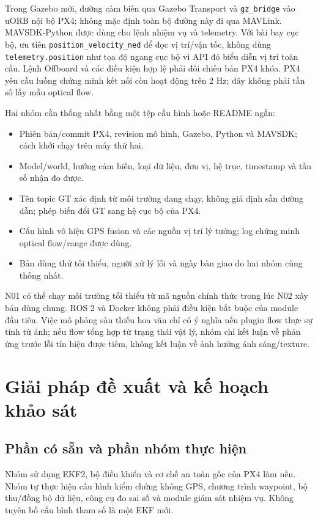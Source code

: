 \documentclass[a4paper,12pt]{article}
\newcommand{\code}[1]{\texttt{#1}}
\begin{document}
Trong Gazebo mới, đường cảm biến qua Gazebo Transport và \code{gz\_bridge} vào uORB nội bộ PX4; không mặc định toàn bộ đường này đi qua MAVLink\cite{bridge}. MAVSDK-Python được dùng cho lệnh nhiệm vụ và telemetry. Với bài bay cục bộ, ưu tiên \code{position\_velocity\_ned} để đọc vị trí/vận tốc, không dùng \code{telemetry.position} như tọa độ ngang cục bộ vì API đó biểu diễn vị trí toàn cầu\cite{sdk}. Lệnh Offboard và các điều kiện hợp lệ phải đối chiếu bản PX4 khóa. PX4 yêu cầu luồng chứng minh kết nối còn hoạt động trên 2 Hz; đây không phải tần số lấy mẫu optical flow\cite{offboard}.

Hai nhóm cần thống nhất bằng một tệp cấu hình hoặc README ngắn:
\begin{itemize}
\item Phiên bản/commit PX4, revision mô hình, Gazebo, Python và MAVSDK; cách khởi chạy trên máy thứ hai.
\item Model/world, hướng cảm biến, loại dữ liệu, đơn vị, hệ trục, timestamp và tần số nhận đo được.
\item Tên topic GT xác định từ môi trường đang chạy, không giả định sẵn đường dẫn; phép biến đổi GT sang hệ cục bộ của PX4.
\item Cấu hình vô hiệu GPS fusion và các nguồn vị trí lý tưởng; log chứng minh optical flow/range được dùng.
\item Bản dùng thử tối thiểu, người xử lý lỗi và ngày bàn giao do hai nhóm cùng thống nhất.
\end{itemize}

N01 có thể chạy môi trường tối thiểu từ mã nguồn chính thức trong lúc N02 xây bản dùng chung. ROS 2 và Docker không phải điều kiện bắt buộc của module đầu tiên. Việc mô phỏng sàn thiếu hoa văn chỉ có ý nghĩa nếu plugin flow thực sự tính từ ảnh; nếu flow tổng hợp từ trạng thái vật lý, nhóm chỉ kết luận về phản ứng trước lỗi tín hiệu được tiêm, không kết luận về ảnh hưởng ánh sáng/texture.

\section{Giải pháp đề xuất và kế hoạch khảo sát}
\subsection{Phần có sẵn và phần nhóm thực hiện}
Nhóm sử dụng EKF2, bộ điều khiển và cơ chế an toàn gốc của PX4 làm nền. Nhóm tự thực hiện cấu hình kiểm chứng không GPS, chương trình waypoint, bộ thu/đồng bộ dữ liệu, công cụ đo sai số và module giám sát nhiệm vụ. Không tuyên bố cấu hình tham số là một EKF mới.
\end{document}
